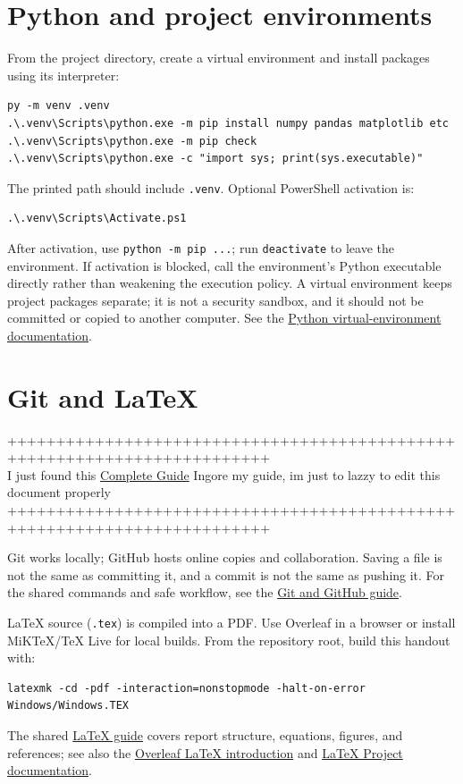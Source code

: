 \documentclass[11pt]{article}
\begin{document}
\section{Python and project environments}
From the project directory, create a virtual environment and install packages using its interpreter:
\begin{lstlisting}
py -m venv .venv
.\.venv\Scripts\python.exe -m pip install numpy pandas matplotlib etc
.\.venv\Scripts\python.exe -m pip check
.\.venv\Scripts\python.exe -c "import sys; print(sys.executable)"
\end{lstlisting}
The printed path should include \texttt{.venv}. Optional PowerShell
activation is:
\begin{lstlisting}
.\.venv\Scripts\Activate.ps1
\end{lstlisting}
After activation, use \texttt{python -m pip ...}; run \texttt{deactivate} to
leave the environment. If activation is blocked, call the environment's
Python executable directly rather than weakening the execution policy.
A virtual environment keeps project packages separate; it is not a security
sandbox, and it should not be committed or copied to another computer. See the
\href{https://docs.python.org/3/library/venv.html}{Python virtual-environment
documentation}.

\section{Git and LaTeX}
+++++++++++++++++++++++++++++++++++++++++++++++++++++++++++++++++++++++++\\
I just found this \href{https://gist.github.com/Foadsf/768e6f023c45e3d078be7793cdb9e102}{Complete Guide} Ingore my guide, im just to lazzy to edit this document properly\\
+++++++++++++++++++++++++++++++++++++++++++++++++++++++++++++++++++++++++

Git works locally; GitHub hosts online copies and collaboration. Saving a file
is not the same as committing it, and a commit is not the same as pushing it.
For the shared commands and safe workflow, see the
\href{../Git/Git.pdf}{Git and GitHub guide}.

LaTeX source (\texttt{.tex}) is compiled into a PDF. Use Overleaf in a browser
or install MiKTeX/TeX Live for local builds. From the repository root, build
this handout with:
\begin{lstlisting}
latexmk -cd -pdf -interaction=nonstopmode -halt-on-error Windows/Windows.TEX
\end{lstlisting}
The shared \href{../LaTeX/LaTeX.pdf}{LaTeX guide} covers report structure,
equations, figures, and references; see also the
\href{https://www.overleaf.com/learn/latex/Learn_LaTeX_in_30_minutes}{Overleaf
LaTeX introduction} and
\href{https://www.latex-project.org/help/documentation/}{LaTeX Project
documentation}.
\end{document}
